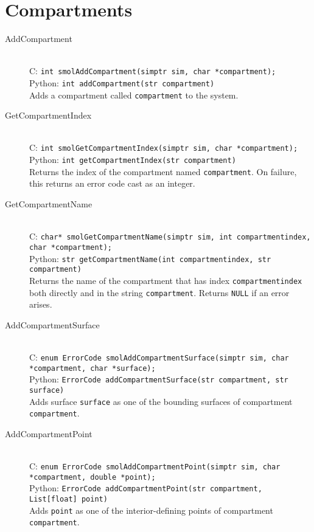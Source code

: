 \documentclass {book}
\begin{document}
\section{Compartments}

\begin{description}

\item[AddCompartment]
\hfill \\
C: \texttt{int smolAddCompartment(simptr sim, char *compartment);}\\
Python: \texttt{int addCompartment(str compartment)}\\
Adds a compartment called \texttt{compartment} to the system.

\item[GetCompartmentIndex]
\hfill \\
C: \texttt{int smolGetCompartmentIndex(simptr sim, char *compartment);}\\
Python: \texttt{int getCompartmentIndex(str compartment)}\\
Returns the index of the compartment named \texttt{compartment}. On failure, this returns an error code cast as an integer.

\item[GetCompartmentName]
\hfill \\
C: \texttt{char* smolGetCompartmentName(simptr sim, int compartmentindex, char *compartment);}\\
Python: \texttt{str getCompartmentName(int compartmentindex, str compartment)}\\
Returns the name of the compartment that has index \texttt{compartmentindex} both directly and in the string \texttt{compartment}. Returns \texttt{NULL} if an error arises.

\item[AddCompartmentSurface]
\hfill \\
C: \texttt{enum ErrorCode smolAddCompartmentSurface(simptr sim, char *compartment, char *surface);}\\
Python: \texttt{ErrorCode addCompartmentSurface(str compartment, str surface)}\\
Adds surface \texttt{surface} as one of the bounding surfaces of compartment \texttt{compartment}.

\item[AddCompartmentPoint]
\hfill \\
C: \texttt{enum ErrorCode smolAddCompartmentPoint(simptr sim, char *compartment, double *point);}\\
Python: \texttt{ErrorCode addCompartmentPoint(str compartment, List[float] point)}\\
Adds \texttt{point} as one of the interior-defining points of compartment \texttt{compartment}.


\end{description}
\end{document}
